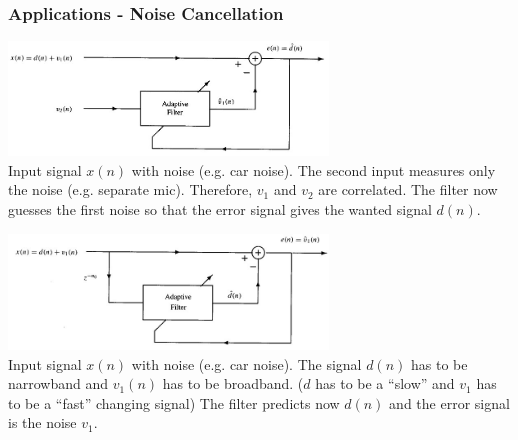 \subsubsection{Applications - Noise Cancellation }
\begin{minipage}{9cm}
        \includegraphics[width=8.5cm]{../TSM_StatDig/bilder/adaptiveNoiseCancellation.jpg}\\
        Input signal $x(n)$ with noise (e.g. car noise). 
        The second input measures only the noise (e.g. separate mic). Therefore, $v_1$ and $v_2$ are correlated.
        The filter now guesses the first noise so that the error signal gives the wanted signal $d(n)$.     
\end{minipage}
\hspace{3mm}
\begin{minipage}{9cm}
        \includegraphics[width=8.5cm]{../TSM_StatDig/bilder/NoiseCancellationwithoutRef.jpg}\\
        Input signal $x(n)$ with noise (e.g. car noise). The signal $d(n)$ has to be narrowband and $v_1(n)$ has to be broadband. ($d$ has to be a ``slow''  and $v_1$ has to be a ``fast'' changing signal)
        The filter predicts now $d(n)$ and the error signal is the noise $v_1$.
\end{minipage}


